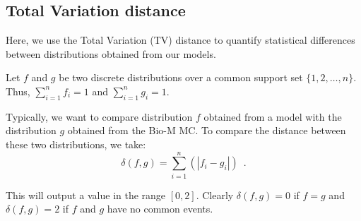 \subsection{Total Variation distance}
Here, we use the Total Variation (TV) distance to quantify statistical differences between distributions obtained from our models.

Let $f$ and $g$ be two discrete distributions over a common support set $\{1,2,\ldots,n\}$.
Thus, $\sum_{i=1}^{n}f_{i} = 1$ and $\sum_{i=1}^{n}g_{i} = 1$.

Typically, we want to compare distribution $f$ obtained from a model with the distribution $g$ obtained from the Bio-M MC. To compare the distance between these two distributions, we take:
\begin{equation}
\delta(f, g) = \sum_{i=1}^{n}(|f_{i} - g_{i}|)\enspace{.}
\end{equation}

This will output a value in the range $[0, 2]$.
Clearly $\delta(f, g)=0$ if $f=g$ and $\delta(f, g)=2$ if $f$ and $g$ have no common events.
